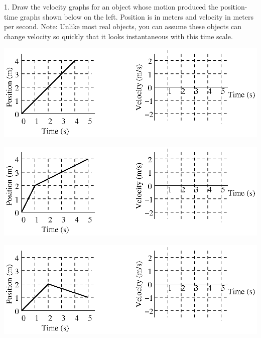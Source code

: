 1. Draw the velocity graphs for an object whose motion produced the position-time
graphs shown below on the left. Position is in meters and velocity in meters
per second. Note: Unlike most real objects, you can assume these objects can
change velocity so quickly that it looks instantaneous with this time scale.

\vspace{0.3cm}
{\par\centering \includegraphics{relating_fig3.eps} \par}
\vspace{0.3cm}

\vspace{0.3cm}
{\par\centering \includegraphics{relating_fig4.eps} \par}
\vspace{0.3cm}

\vspace{0.3cm}
{\par\centering \includegraphics{relating_fig5.eps} \par}
\vspace{0.3cm}

